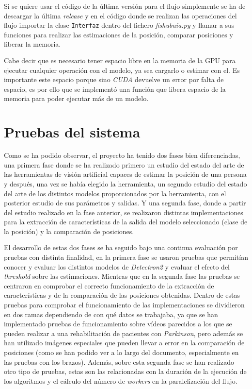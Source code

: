 Si se quiere usar el código de la última versión para el flujo simplemente se ha de descargar la última \textit{release} y en el código donde se realizan las operaciones del flujo importar la clase \texttt{Interfaz} dentro del fichero \textit{fishubuia.py} y llamar a sus funciones para realizar las estimaciones de la posición, comparar posiciones y liberar la memoria.

Cabe decir que es necesario tener espacio libre en la memoria de la GPU para ejecutar cualquier operación con el modelo, ya sea cargarlo o estimar con el. Es importante este espacio porque sino \textit{CUDA} devuelve un error por falta de espacio, es por ello que se implementó una función que libera espacio de la memoria para poder ejecutar más de un modelo.

\section{Pruebas del sistema}
Como se ha podido observar, el proyecto ha tenido dos fases bien diferenciadas, una primera fase donde se ha realizado primero un estudio del estado del arte de las herramientas de visión artificial capaces de estimar la posición de una persona y después, una vez se había elegido la herramienta, un segundo estudio del estado del arte de los distintos modelos proporcionados por la herramienta, con el posterior estudio de sus parámetros y salidas. Y una segunda fase, donde a partir del estudio realizado en la fase anterior, se realizaron distintas implementaciones para la extracción de características de la salida del modelo seleccionado (clase de la posición) y la comparación de posiciones.

El desarrollo de estas dos fases se ha seguido bajo una continua evaluación por pruebas con distinta finalidad, en la primera fase se usaron pruebas que permitían conocer y evaluar los distintos modelos de \textit{Detectron2} y evaluar el efecto del \textit{threshold} sobre las estimaciones. Mientras que en la segunda fase las pruebas se centraron en comprobar el correcto funcionamiento de la extracción de características y de la comparación de las posiciones obtenidas. Dentro de estas pruebas para comprobar el funcionamiento de las implementaciones se dividieron en dos ramas dependiendo de con qué datos se trabajaba, ya que se han implementado pruebas de funcionamiento sobre vídeos parecidos a los que se pueden realizar a una rehabilitación de pacientes con \textit{Parkinson}, pero además se han utilizado imágenes especiales que pueden llevar a error en la comparación de posiciones (como se han podido ver a lo largo del documento, especialmente en las pruebas con los brazos). Además, sobre esta segunda fase se han realizado otro tipo de pruebas, estas son las relacionadas con la duración de la ejecución de los algoritmos y el cálculo del número de \textit{workers} en la paralelización del flujo.

